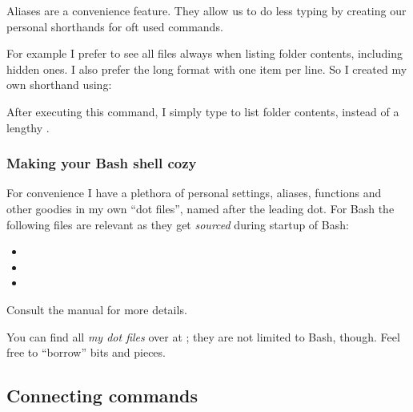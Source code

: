 \documentclass{olli-handout}
\begin{document}
\begin{refmanbash}
\end{refmanbash}

Aliases are a convenience feature. They allow us to do less typing by creating our personal shorthands for oft used commands.

For example I prefer to see all files always when listing folder contents, including hidden ones. I also prefer the long format with one item per line. So I created my own shorthand  using:


After executing this command, I simply type  to list folder contents, instead of a lengthy .

\subsubsection{Making your Bash shell cozy}

\begin{refmanbash}
\end{refmanbash}

\begin{hintbox}
{\olliHandLeft} For convenience I have a plethora of personal settings, aliases, functions and other goodies in my own ``dot files'', named after the leading dot. For Bash the following files are relevant as they get \emph{sourced} during startup of Bash:
	\begin{itemize}
		\item {}
		\item {}
		\item {}
	\end{itemize}
Consult the manual for more details.

You can find all \emph{my dot files} over at ; they are not limited to Bash, though. Feel free to ``borrow'' bits and pieces.
\end{hintbox}

\subsection{Connecting commands}\label{cmd_combos}
\end{document}
